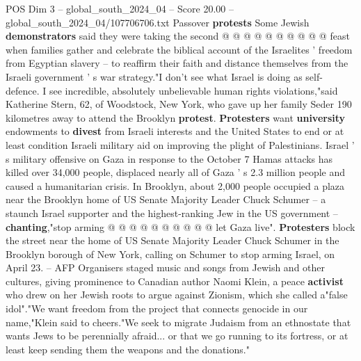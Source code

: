 \begin{textsample}{POS Dim 3 – global\_south\_2024\_04 – Score 20.00 – global\_south\_2024\_04/107706706.txt}
Passover \textbf{protests} Some Jewish \textbf{demonstrators} said they were taking the second @ @ @ @ @ @ @ @ @ @ feast when families gather and celebrate the biblical account of the Israelites ' freedom from Egyptian slavery -- to reaffirm their faith and distance themselves from the Israeli government ' s war strategy."I don't see what Israel is doing as self-defence.
I see incredible, absolutely unbelievable human rights violations,"said Katherine Stern, 62, of Woodstock, New York, who gave up her family Seder 190 kilometres away to attend the Brooklyn \textbf{protest}. \textbf{Protesters} want \textbf{university} endowments to \textbf{divest} from Israeli interests and the United States to end or at least condition Israeli military aid on improving the plight of Palestinians.
Israel ' s military offensive on Gaza in response to the October 7 Hamas attacks has killed over 34,000 people, displaced nearly all of Gaza ' s 2.3 million people and caused a humanitarian crisis.
In Brooklyn, about 2,000 people occupied a plaza near the Brooklyn home of US Senate Majority Leader Chuck Schumer -- a staunch Israel supporter and the highest-ranking Jew in the US government -- \textbf{chanting},"stop arming @ @ @ @ @ @ @ @ @ @ let Gaza live". \textbf{Protesters} block the street near the home of US Senate Majority Leader Chuck Schumer in the Brooklyn borough of New York, calling on Schumer to stop arming Israel, on April 23. -- AFP Organisers staged music and songs from Jewish and other cultures, giving prominence to Canadian author Naomi Klein, a peace \textbf{activist} who drew on her Jewish roots to argue against Zionism, which she called a"false idol"."We want freedom from the project that connects genocide in our name,"Klein said to cheers."We seek to migrate Judaism from an ethnostate that wants Jews to be perennially afraid... or that we go running to its fortress, or at least keep sending them the weapons and the donations."

\end{textsample}
